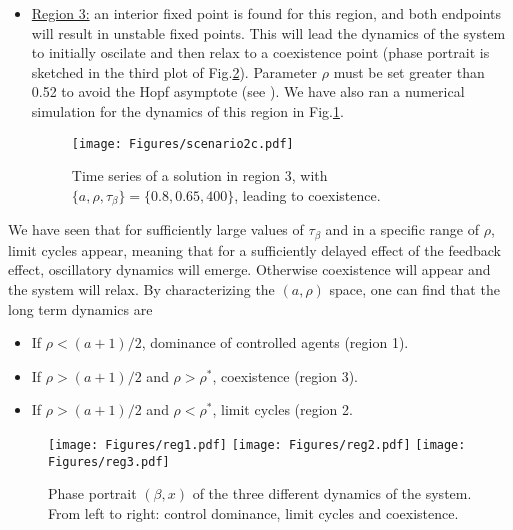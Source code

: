\documentclass[10pt,a4paper]{article}
\begin{document}
\begin{itemize}
 \item {\underline{Region 3:} an interior fixed point is found for this region, and both endpoints will result in unstable fixed points. This will lead the 
 dynamics of the system to initially oscilate and then relax to a coexistence point (phase portrait is sketched in the third plot of Fig.\ref{fig:portrait_2}). 
 Parameter $\rho$ must be set greater than 0.52 to avoid the Hopf asymptote (see \cite{Strogatz:evolutionary}). We have also ran a numerical simulation for the dynamics 
 of this region in Fig.\ref{fig:scenario2c}.
 
\begin{figure}[h!]
\centering
\vspace{-2.0cm}
\texttt{[image: Figures/scenario2c.pdf]}
\vspace{-0.4cm}
\caption{Time series of a solution in region 3, with  $\{a,\rho,\tau_{\beta}\}=\{0.8,0.65,400\}$, leading to coexistence.}
\label{fig:scenario2c}
\end{figure}
}

\end{itemize}

We have seen that for sufficiently large values of $\tau_{\beta}$ and in a specific range of $\rho$, limit cycles appear, meaning that for a sufficiently delayed effect of the
feedback effect, oscillatory dynamics will emerge. Otherwise coexistence will appear and the system will relax. By characterizing the $(a,\rho)$ space, one can find that
the long term dynamics are

\begin{itemize}
 \item If $\rho<(a+1)/2$, dominance of controlled agents (region 1).
 \item If $\rho>(a+1)/2$ and $\rho > \rho^*$, coexistence (region 3).
 \item If $\rho>(a+1)/2$ and $\rho < \rho^*$, limit cycles (region 2.
\end{itemize}

\begin{figure}[h!]
\centering
\texttt{[image: Figures/reg1.pdf]}
\texttt{[image: Figures/reg2.pdf]}
\texttt{[image: Figures/reg3.pdf]}
\vspace{-0.4cm}
\caption{Phase portrait $(\beta,x)$ of the three different dynamics of the system. From left to right: control dominance, limit cycles and coexistence.}
\label{fig:portrait_2}
\end{figure}
\end{document}
